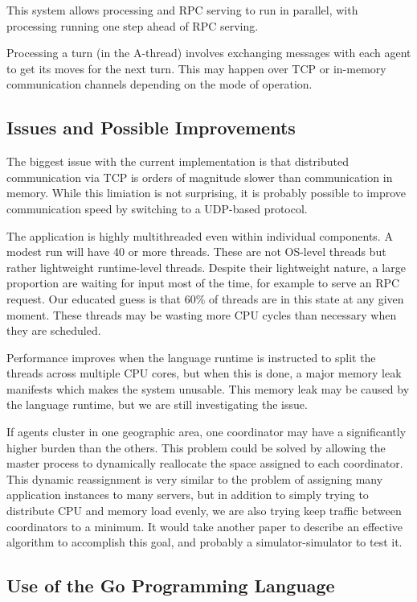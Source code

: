 This system allows processing and RPC serving to run in parallel, with processing running one step
ahead of RPC serving.

Processing a turn (in the A-thread) involves exchanging messages with each agent to get its moves
for the next turn. This may happen over TCP or in-memory communication channels depending on the
mode of operation.

\subsection{Issues and Possible Improvements}

The biggest issue with the current implementation is that distributed communication via TCP is
orders of magnitude slower than communication in memory. While this limiation is not surprising, it
is probably possible to improve communication speed by switching to a UDP-based protocol.

The application is highly multithreaded even within individual components. A modest run will have 40
or more threads. These are not OS-level threads but rather lightweight runtime-level threads.
Despite their lightweight nature, a large proportion are waiting for input most of the time, for
example to serve an RPC request. Our educated guess is that 60\% of threads are in this state at any
given moment. These threads may be wasting more CPU cycles than necessary when they are scheduled.

Performance improves when the language runtime is instructed to split the threads across multiple
CPU cores, but when this is done, a major memory leak manifests which makes the system unusable.
This memory leak may be caused by the language runtime, but we are still investigating the issue.

If agents cluster in one geographic area, one coordinator may have a significantly higher burden
than the others. This problem could be solved by allowing the master process to dynamically
reallocate the space assigned to each coordinator. This dynamic reassignment is very similar to the
problem of assigning many application instances to many servers, but in addition to simply trying to
distribute CPU and memory load evenly, we are also trying keep traffic between coordinators to a
minimum. It would take another paper to describe an effective algorithm to accomplish this goal, and
probably a simulator-simulator to test it.

\subsection{Use of the Go Programming Language}

